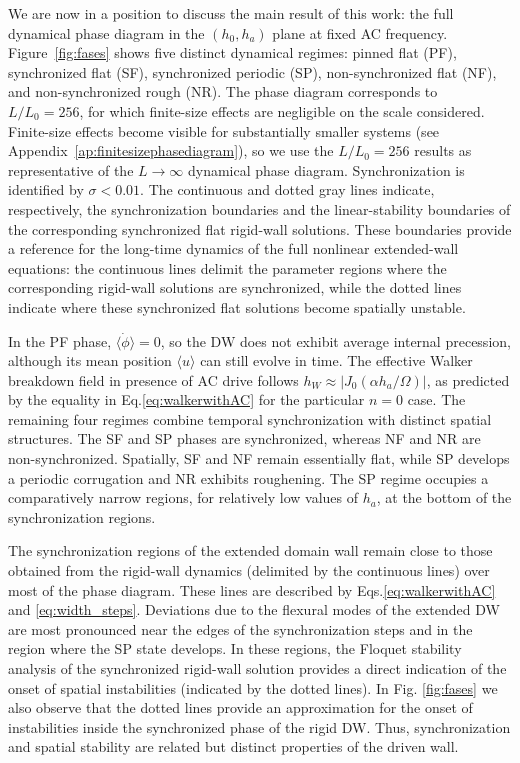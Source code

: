 \documentclass[prb,aps,twocolumn,superscriptaddress,floatfix]{revtex4-1}
\begin{document}
We are now in a position to discuss the main result of this work: the full dynamical phase diagram in the $(h_0,h_a)$ plane at fixed AC frequency. Figure~\ref{fig:fases} shows five distinct dynamical regimes: pinned flat (PF), synchronized flat (SF), synchronized periodic (SP), non-synchronized flat (NF), and non-synchronized rough (NR). The phase diagram corresponds to $L/L_0=256$, for which finite-size effects are negligible on the scale considered. Finite-size effects become visible for substantially smaller systems (see Appendix~\ref{ap:finitesizephasediagram}), so we use the $L/L_0=256$ results as representative of the $L\to\infty$ dynamical phase diagram. Synchronization is identified by $\sigma<0.01$. The continuous and dotted gray lines indicate, respectively, the synchronization boundaries and the linear-stability boundaries of the corresponding synchronized flat rigid-wall solutions. These boundaries provide a reference for the long-time dynamics of the full nonlinear extended-wall equations: the continuous lines delimit the parameter regions where the corresponding rigid-wall solutions are synchronized, while the dotted lines indicate where these synchronized flat solutions become spatially unstable.


In the PF phase, $\langle\dot{\phi}\rangle=0$, so the DW does not exhibit average internal precession, although its mean position $\langle u\rangle$ can still evolve in time. The effective Walker breakdown field in presence of AC drive follows $h_W \approx |J_0(\alpha h_a/\Omega)|$, as predicted by the equality in Eq.\eqref{eq:walkerwithAC} for the particular $n=0$ case. The remaining four regimes combine temporal synchronization with distinct spatial structures. The SF and SP phases are synchronized, whereas NF and NR are non-synchronized. Spatially, SF and NF remain essentially flat, while SP develops a periodic corrugation and NR exhibits roughening. 
The SP regime occupies a comparatively narrow regions, for relatively low values of $h_a$, at the bottom of the synchronization regions. 

The synchronization regions of the extended domain wall remain close to those obtained from the rigid-wall dynamics (delimited by the continuous lines) over most of the phase diagram. These lines are described by Eqs.\eqref{eq:walkerwithAC} and \eqref{eq:width_steps}. 
Deviations due to the flexural modes of the extended DW are most pronounced near the edges of the synchronization steps and in the region where the SP state develops. In these regions, the Floquet stability analysis of the synchronized rigid-wall solution provides a direct indication of the onset of spatial instabilities (indicated by the dotted lines). In Fig. \ref{fig:fases} we also observe that the dotted lines provide an approximation for the onset of instabilities inside the synchronized phase of the rigid DW.
Thus, synchronization and spatial stability are related but distinct properties of the driven wall. 
\end{document}
